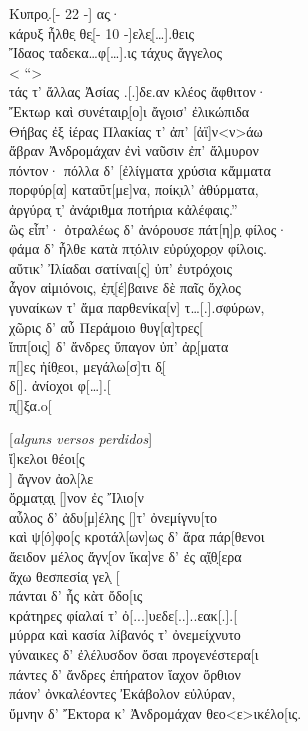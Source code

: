 \begin{gkverse}
Κυπρο̣.[\qquad     - 22 -\qquad       ] ας̣·\\
κάρυξ ἦλθε̣ θε̣[\qquad - 10 -\qquad  ]ελε̣[\ldots{}].θεις\\
Ἴδαος ταδεκα\ldots{}φ[\ldots{}].ις τάχυς ἄγγελος\\
< ``\qquad			>\\
τάς τ’ ἄλλας Ἀσίας .[.]δε.αν κλέος ἄφθιτον·\\
Ἔκτωρ καὶ συνέταιρ̣[ο]ι ἄγ̣οισ’ ἐλικώπιδα\\
Θήβας ἐξ ἰέρας Πλακίας τ’ ἀπ’ [ἀϊ]ν<ν>άω\\
ἄβραν Ἀνδρομάχαν ἐνὶ ναῦσιν ἐπ’ ἄλμυρον\\
πόντον· πόλλα δ’ [ἐλίγματα χρύσια κἄμματα\\
πορφύρ[α] καταΰτ[με]να, ποίκ̣ιλ’ ἀθύρματα,\\
ἀργύρα̣ τ̣’ ἀνά̣ριθ̣μα ποτήρια κἀλέφαις.''\\
ὢς εἶπ’· ὀτραλέως δ’ ἀνόρουσε πάτ[η]ρ̣ φίλος·\\
φάμα δ’ ἦλθε κατὰ πτ̣όλιν εὐρύχο̣ρ̣ο̣ν φίλοις.\\
αὔτικ’ Ἰλίαδαι σατίναι[ς] ὐπ’ ἐυτρόχοις\\
ἆγον αἰμιόνοις, ἐ̣π̣[έ]βαινε δὲ παῖς ὄχλος\\
γυναίκων τ’ ἄμα παρθενίκα[ν] τ\ldots{}[.].σφύρων,\\
χῶρις δ’ αὖ Περάμοιο θυγ[α]τρες[\\
ἴππ[οις] δ’ ἄνδρες ὔπαγον ὐπ’ ἀρ̣[ματα\\
π[\qquad  ]ες ἠίθ̣εοι, μεγάλω[σ]τι δ̣[\\
δ[\qquad  ]. ἀνίοχοι φ[\ldots{}].[\\
π̣[\qquad  ]ξα.o[

\textnormal{[\textit{alguns versos perdidos}]}\\

\vinphantom{ὄ̣ρ̣ματ̣α̣ι̣ [\qquad\qquad\quad}    ἴ]κελοι θέοι[ς\\
\vinphantom{ὄ̣ρ̣ματ̣α̣ι̣ [\qquad\qquad\quad}     ] ἄγνον ἀολ[λε\\
ὄ̣ρ̣ματ̣α̣ι̣ [\qquad\qquad\quad			     ]νον ἐς Ἴλιο[ν\\
αὖλος δ’ ἀδυ[μ]έλης̣ [\qquad	    ]τ’ ὀνεμίγνυ[το\\
καὶ ψ[ό]φο[ς κροτάλ[ων\qquad    ]ως δ’ ἄρα πάρ[θενοι\\
ἄειδον μέλος ἄγν̣[ον ἴκα]νε δ’ ἐς α̣ἴ̣θ̣[ερα\\
ἄχω θεσπεσία̣ γελ̣ [\\
πάνται δ’ ἦς κὰτ ὄδο[ις\\
κράτηρες φίαλαί τ’ ὀ[...]υεδε[..]..εακ[.].[\\
μύρρα καὶ κασία λίβανός τ’ ὀνεμείχνυτο\\
γύναικες δ’ ἐλέλυσδον ὄσαι προγενέστερα[ι\\
πάντες δ’ ἄνδρες ἐπήρατον ἴαχον ὄρθιον\\
πάον’ ὀνκαλέοντες Ἐκάβολον εὐλύραν,\\
ὔμνην δ’ Ἔκτορα κ’ Ἀνδρομάχαν θεο<ε>ικέλο[ις.	
\end{gkverse}

